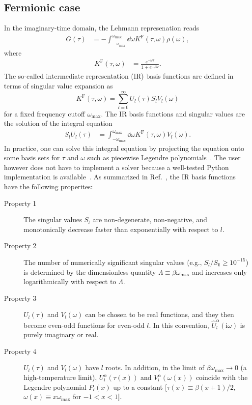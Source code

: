 \documentclass[submission, LectureNotes]{SciPost}
\newcommand{\wmax}{\ensuremath{{\omega_\mathrm{max}}}}
\newcommand\ii{\mathrm{i}}%
\newcommand\iw{\ii\omega}%
\newcommand{\KF}{\ensuremath{K^\mathrm{F}}}
\begin{document}
\subsection{Fermionic case}
In the imaginary-time domain, the Lehmann represenation reads 
\begin{align}
    G(\tau) &= - \int_{-\wmax}^\wmax \dd\omega \KF(\tau, \omega) \rho(\omega),\label{eq:gtau-fermion}
\end{align}
where 
\begin{align}
    \KF(\tau, \omega) &= \frac{e^{-\omega\tau}}{1 + e^{-\beta\omega}}.
\end{align}
The so-called intermediate representation (IR) basis functions are defined in terms of singular value expansion as
\begin{equation}
    K^\mathrm{F}(\tau,\omega)=
    \sum_{l=0}^\infty U_l(\tau)S_l V_l(\omega)\label{eq:sve-tau}
\end{equation}
for a fixed frequency cutoff $\wmax$.
The IR basis functions and singular values are the solution of the integral equation
\begin{align}
    S_l U_l(\tau) &= \int_{-\wmax}^\wmax \dd\omega \KF(\tau, \omega) V_l(\omega).\label{eq:integral-eq}
\end{align}
In practice, one can solve this integral equation by projecting the equation onto some basis sets for $\tau$ and $\omega$
such as piecewise Legendre polynomials~\cite{Chikano:2018gd}.
The user however does not have to implement a solver
because a well-tested Python implementation is available~\cite{irbasis2019,irbasis3}.
As summarized in Ref.~\cite{shinaoka2021efficient}, the IR basis functions have the following properites:
\begin{description}
    \item[Property 1] The singular values $S_l$ are non-degenerate, non-negative, and monotonically decrease faster than exponentially with respect to $l$.
    \item[Property 2] The number of numerically significant singular values (e.g., $S_l/S_0 \ge 10^{-15}$) is determined by the dimensionless quantity $\Lambda\equiv\beta\wmax$ and increases only logarithmically with respect to $\Lambda$.
    \item[Property 3] $U_l(\tau)$ and $V_l(\omega)$ can be chosen to be real functions, and they then become even-odd functions for even-odd $l$. In this convention, $\hat{U}_l^\alpha(\iw)$ is purely imaginary or real.
    \item[Property 4] $U_l(\tau)$ and $V_l(\omega)$ have $l$ roots. In addition, in the limit of $\beta\wmax\rightarrow 0$ (a high-temperature limit), $U_l^\alpha(\tau(x))$ and $V_l^\alpha(\omega(x))$ coincide with the Legendre polynomial $P_l(x)$ up to a constant [$\tau(x) \equiv \beta(x+1)/2$, $\omega(x) \equiv x \wmax$ for $-1 < x < 1$].
\end{description}
\end{document}
